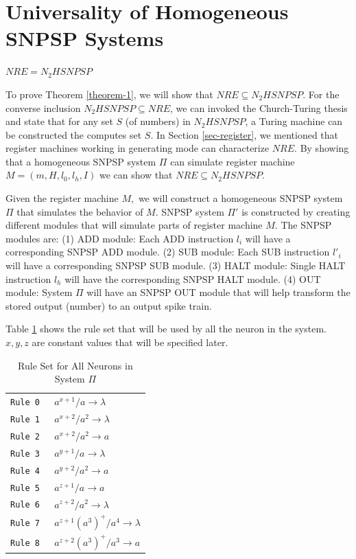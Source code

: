 \documentclass[smallextended]{svjour3}
\begin{document}
\section{Universality of Homogeneous SNPSP Systems} \label{homogeneous-snpsp}

\begin{theorem}\label{theorem-1}
$NRE = N_2HSNPSP$ 
\end{theorem}

\proof To prove Theorem \ref{theorem-1}, we will show that $NRE \subseteq N_2HSNPSP$. For the converse inclusion $N_2HSNPSP \subseteq NRE$, we can
invoked the Church-Turing thesis and state that for any set $S$ (of numbers) in $N_2HSNPSP$, a Turing machine can be constructed the computes set $S$. 
In Section \ref{sec-register}, we mentioned that register machines  working in generating mode can characterize $NRE$. By showing that a homogeneous
SNPSP system $\Pi$ can simulate register machine $M=(m, H, l_0, l_h, I)$ we can show that $NRE \subseteq N_2HSNPSP$.

Given the register machine $M,$ we will construct a homogeneous SNPSP system $\Pi$ that simulates the behavior of $M$. SNPSP system $\Pi'$ 
is constructed by creating different modules that will simulate parts of register machine $M.$ The SNPSP modules are:
(1)  ADD module: Each ADD instruction $l_i$ will have a corresponding SNPSP ADD module.
(2)  SUB module: Each SUB instruction $l'_i$ will have a corresponding SNPSP SUB module. 
(3)  HALT module: Single HALT instruction $l_h$ will have the corresponding SNPSP HALT module.
(4)  OUT module: System $\Pi$ will have an SNPSP OUT module that will help transform the stored output (number) to an output spike train.

Table \ref{table-rules} shows the rule set that will be used by all the neuron in the system. $x,y,z$ are constant values that will be specified
later.

\begin{table}[H]
\begin{center}
\begin{tabular}{|r|l|}
\hline
\tt{Rule 0}  & $a^{x+1}/a          \rightarrow \lambda$  \\ 
\tt{Rule 1}  & $a^{x+2}/a^2        \rightarrow \lambda$  \\ 
\tt{Rule 2}  & $a^{x+2}/a^2        \rightarrow a$        \\ \hline 
\tt{Rule 3}  & $a^{y+1}/a          \rightarrow \lambda$  \\ 
\tt{Rule 4}  & $a^{y+2}/a^2        \rightarrow a$        \\ \hline
\tt{Rule 5}  & $a^{z+1}/a          \rightarrow a$        \\ 
\tt{Rule 6}  & $a^{z+2}/a^2        \rightarrow \lambda$  \\ 
\tt{Rule 7}  & $a^{z+1}(a^3)^+/a^4 \rightarrow \lambda$  \\
\tt{Rule 8}  & $a^{z+2}(a^3)^+/a^3 \rightarrow a$        \\ \hline
\end{tabular}
\end{center}
\caption{Rule Set for All Neurons in System $\Pi$}
\label{table-rules}
\end{table}
\end{document}
